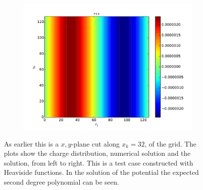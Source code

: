 \begin{figure}
\begin{subfigure}[b]{0.6\textwidth}
			\end{subfigure}
			\begin{subfigure}[b]{0.6\textwidth}
				\includegraphics[width = \textwidth]{figures/verification/analytical/heaviside/residual.pdf}
			\end{subfigure}
		\caption{As earlier this is a \(x,y\)-plane cut along \(x_k=32\), of the grid. The plots show the charge distribution,
		numerical solution and the solution, from left to right. This is a test case constructed
		with Heaviside functions. In the solution of the potential the expected second degree polynomial can be seen.
		}
		\label{fig:heaviside}
	\end{figure}

